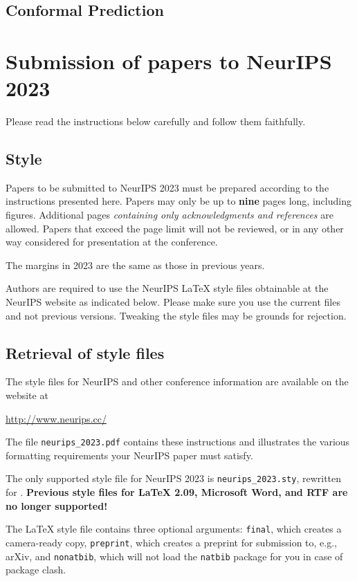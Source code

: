 \documentclass{article}
\begin{document}
\subsection{Conformal Prediction}\label{app:eccco}


\section{Submission of papers to NeurIPS 2023}


Please read the instructions below carefully and follow them faithfully.


\subsection{Style}


Papers to be submitted to NeurIPS 2023 must be prepared according to the
instructions presented here. Papers may only be up to {\bf nine} pages long,
including figures. Additional pages \emph{containing only acknowledgments and
references} are allowed. Papers that exceed the page limit will not be
reviewed, or in any other way considered for presentation at the conference.


The margins in 2023 are the same as those in previous years.


Authors are required to use the NeurIPS \LaTeX{} style files obtainable at the
NeurIPS website as indicated below. Please make sure you use the current files
and not previous versions. Tweaking the style files may be grounds for
rejection.


\subsection{Retrieval of style files}


The style files for NeurIPS and other conference information are available on
the website at
\begin{center}
  \url{http://www.neurips.cc/}
\end{center}
The file \verb+neurips_2023.pdf+ contains these instructions and illustrates the
various formatting requirements your NeurIPS paper must satisfy.


The only supported style file for NeurIPS 2023 is \verb+neurips_2023.sty+,
rewritten for \LaTeXe{}.  \textbf{Previous style files for \LaTeX{} 2.09,
  Microsoft Word, and RTF are no longer supported!}


The \LaTeX{} style file contains three optional arguments: \verb+final+, which
creates a camera-ready copy, \verb+preprint+, which creates a preprint for
submission to, e.g., arXiv, and \verb+nonatbib+, which will not load the
\verb+natbib+ package for you in case of package clash.
\end{document}
